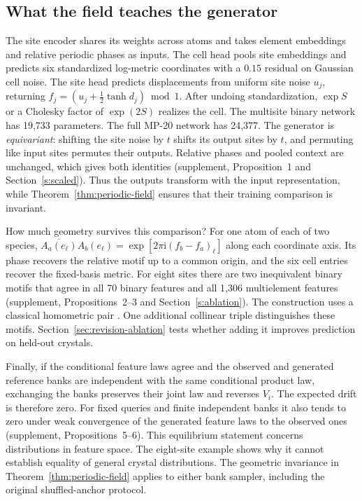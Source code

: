 \documentclass[10pt]{article}
\begin{document}
\subsection{What the field teaches the generator}
The site encoder shares its weights across atoms and takes element embeddings and relative periodic phases as inputs. The cell head pools site embeddings and predicts six standardized log-metric coordinates with a $0.15$ residual on Gaussian cell noise. The site head predicts displacements from uniform site noise $u_j$, returning $f_j=(u_j+\tfrac12\tanh d_j)\bmod 1$. After undoing standardization, $\exp S$ or a Cholesky factor of $\exp(2S)$ realizes the cell. The multisite binary network has 19,733 parameters. The full MP-20 network has 24,377. The generator is \emph{equivariant}: shifting the site noise by $t$ shifts its output sites by $t$, and permuting like input sites permutes their outputs. Relative phases and pooled context are unchanged, which gives both identities (supplement, Proposition~1 and Section~\ref{s:scaled}). Thus the outputs transform with the input representation, while Theorem~\ref{thm:periodic-field} ensures that their training comparison is invariant.

How much geometry survives this comparison? For one atom of each of two species, $\overline{A_a(e_\ell)}A_b(e_\ell)=\exp[2\pi\mathrm{i}(f_b-f_a)_\ell]$ along each coordinate axis. Its phase recovers the relative motif up to a common origin, and the six cell entries recover the fixed-basis metric. For eight sites there are two inequivalent binary motifs that agree in all 70 binary features and all 1,306 multielement features (supplement, Propositions~2--3 and Section~\ref{s:ablation}). The construction uses a classical homometric pair \cite{zrelation}. One additional collinear triple distinguishes these motifs. Section~\ref{sec:revision-ablation} tests whether adding it improves prediction on held-out crystals.

Finally, if the conditional feature laws agree and the observed and generated reference banks are independent with the same conditional product law, exchanging the banks preserves their joint law and reverses $V_i$. The expected drift is therefore zero. For fixed queries and finite independent banks it also tends to zero under weak convergence of the generated feature laws to the observed ones (supplement, Propositions~5--6). This equilibrium statement concerns distributions in feature space. The eight-site example shows why it cannot establish equality of general crystal distributions. The geometric invariance in Theorem~\ref{thm:periodic-field} applies to either bank sampler, including the original shuffled-anchor protocol.
\end{document}
